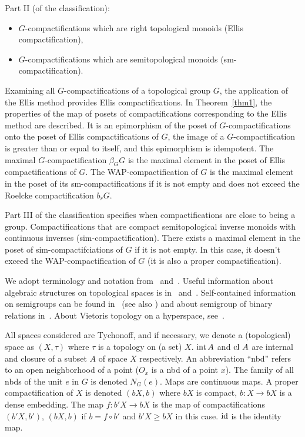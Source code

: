 \documentclass{amsart}
\newcommand{\Int}{\mbox{{\rm int}}\,}
\newcommand{\cl}{\mbox{{\rm cl}}}
\newcommand{\id}{\mbox{{\rm id}}}
\begin{document}
Part II (of the classification):
\begin{itemize}
\item $G$-compactifications which are right topological monoids (Ellis compactification),
\item $G$-compactifications which are semitopological monoids (sm-compactification).
\end{itemize}
Examining all $G$-compactifications of a topological group $G$, the application of the Ellis method provides Ellis compactifications. 
In Theorem~\ref{thm1}, the properties of the map of posets of compactifications corresponding to the Ellis method are described. It is an epimorphism of the poset of $G$-compactifications onto the poset of Ellis compactifications of $G$, the image of a $G$-compactification is greater than or equal to itself, and this epimorphism is idempotent. The maximal $G$-compactification $\beta_G G$ is the maximal element in the poset of Ellis compactifications of $G$. The WAP-compactification of $G$ is the maximal element in the poset of its sm-compactifications if it is not empty and does not exceed the Roelcke compactification $b_r G$. 

Part III of the classification specifies when compactifications are close to being a group. Compactifications that are compact semitopological inverse monoids with continuous inverses (sim-compactification). There exists a maximal element in the poset of sim-compactifciations of $G$  if it is not empty. In this case, it doesn't exceed the WAP-compactification of $G$ (it is also a proper compactification). 

\medskip

We adopt terminology and notation from~\cite{Engelking} and~\cite{RD}. Useful information about algebraic structures on topological spaces is in~\cite{ArhTk} and~\cite{HS}. Self-contained information on semigroups can be found in~\cite{CliffPrest} (see also \cite{Lawson}) and about semigroup of binary relations in~\cite{Birkhoff}. About Vietoris topology on a hyperspace, see~\cite{Beer}. 

All spaces considered are Tychonoff, and if necessary, we denote a (topological) space as $(X, \tau)$ where $\tau$ is a topology on (a set) $X$. $\Int A$ and $\cl\ A$ are internal and closure of a subset $A$ of space $X$ respectively. An abbreviation ``nbd''  refers to an open neighborhood of a point ($O_x$ is a nbd of a point $x$). The family of all nbds of the unit $e$ in $G$ is denoted $N_{G}(e)$. Maps are continuous maps. A proper compactification of $X$ is denoted $(bX, b)$ where $b X$ is compact, $b: X\to b X$ is a dense embedding. The map $f: b' X\to b X$ is the map of compactifications $(b' X, b')$, $(b X, b)$ if $b=f\circ b'$ and $b' X\geq bX$ in this case. $\id$ is the identity map.
\end{document}
